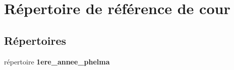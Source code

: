 \section{Répertoire de référence de cour}
\label{dir_7618f9055b47674e59b81430af9b1efb}
\subsection*{Répertoires}
\begin{DoxyCompactItemize}
\item 
répertoire {\bf 1ere\-\_\-annee\-\_\-phelma}
\end{DoxyCompactItemize}
